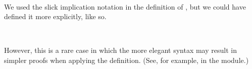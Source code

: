 \begin{code}
\AgdaSymbol{)}\AgdaSpace{}%
\AgdaSpace{}%
\AgdaSymbol{)(}\AgdaSpace{}%
\AgdaSymbol{:}\AgdaSpace{}%
\AgdaSpace{}%
\AgdaSpace{}%
\AgdaSymbol{)}\AgdaSpace{}%
\AgdaSpace{}%
\AgdaSpace{}%
\AgdaSpace{}%
\AgdaSpace{}%
\AgdaSpace{}%
\AgdaSpace{}%
\<%
\\
%
\>[1]\AgdaSpace{}%
\AgdaSpace{}%
%
\>[21]\AgdaSymbol{=}\AgdaSpace{}%
\AgdaSymbol{(}\AgdaSpace{}%
\AgdaSymbol{)}\AgdaSpace{}%
\AgdaOperator{\AgdaFunction{=[}}\AgdaSpace{}%
\AgdaSpace{}%
\AgdaOperator{\AgdaFunction{]⇒}}\AgdaSpace{}%
\<%
\end{code}
\ccpad
We used the slick implication notation in the definition of , but we could have defined it more explicitly, like so.
\ccpad
\begin{code}%
\>[0][@{}l@{\AgdaIndent{1}}]%
\>[1]\AgdaSpace{}%
\AgdaSymbol{:}\AgdaSpace{}%
\AgdaSymbol{(}\AgdaSpace{}%
\AgdaSymbol{:}\AgdaSpace{}%
\AgdaSymbol{(}\AgdaSpace{}%
\AgdaSpace{}%
\AgdaSymbol{)}\AgdaSpace{}%
\AgdaSpace{}%
\AgdaSymbol{)(}\AgdaSpace{}%
\AgdaSymbol{:}\AgdaSpace{}%
\AgdaSpace{}%
\AgdaSpace{}%
\AgdaSymbol{)}\AgdaSpace{}%
\AgdaSpace{}%
\AgdaSpace{}%
\AgdaSpace{}%
\AgdaSpace{}%
\AgdaSpace{}%
\AgdaSpace{}%
\<%
\\
%
\>[1]\AgdaSpace{}%
\AgdaSpace{}%
%
\>[22]\AgdaSymbol{=}\AgdaSpace{}%
\AgdaSpace{}%
\AgdaSpace{}%
\AgdaSpace{}%
\AgdaSpace{}%
\AgdaSymbol{(}\AgdaSpace{}%
\AgdaSymbol{)}\AgdaSpace{}%
\AgdaSpace{}%
\AgdaSpace{}%
\AgdaSpace{}%
\AgdaSpace{}%
\AgdaSymbol{(}\AgdaSpace{}%
\AgdaSymbol{)}\AgdaSpace{}%
\AgdaSymbol{(}\AgdaSpace{}%
\AgdaSymbol{)}\<%
\end{code}
\ccpad
However, this is a rare case in which the more elegant syntax may result in simpler proofs when applying the definition. (See, for example,  in the  module.)
